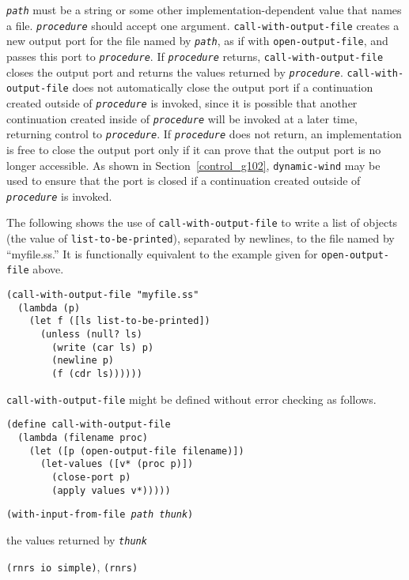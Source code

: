 \texttt{\textit{path}} must be a string or some other implementation-dependent 
value that names a file.
\texttt{\textit{procedure}} should accept one argument.
\texttt{call-with-output-file} creates a new output port for the file named
by \texttt{\textit{path}}, as if with \texttt{open-output-file}, and passes this port to \texttt{\textit{procedure}}.
If \texttt{\textit{procedure}} returns, \texttt{call-with-output-file} closes the output port
and returns the values returned by \texttt{\textit{procedure}}.
\texttt{call-with-output-file} does not automatically close the output
port if a continuation created outside of \texttt{\textit{procedure}} is invoked, since it
is possible that another continuation created inside of \texttt{\textit{procedure}} will be
invoked at a later time, returning control to \texttt{\textit{procedure}}.
If \texttt{\textit{procedure}} does not return, an implementation is free to close the
output port only if it can prove that the output port is no longer accessible.
As shown in Section \ref{control_g102}, \texttt{dynamic-wind} may be used to
ensure that the port is closed if a continuation created outside of
\texttt{\textit{procedure}} is invoked.

The following shows the use of \texttt{call-with-output-file} to
write a list of objects (the value of  \texttt{list-to-be-printed}),
separated by newlines, to the file named by ``myfile.ss.''
It is functionally equivalent to the example given for
\texttt{open-output-file} above.


\begin{alltt}
(call-with-output-file "myfile.ss"
  (lambda (p)
    (let f ([ls list-to-be-printed])
      (unless (null? ls)
        (write (car ls) p)
        (newline p)
        (f (cdr ls))))))
\end{alltt}

\texttt{call-with-output-file} might be defined without error checking as follows.

\begin{alltt}
(define call-with-output-file
  (lambda (filename proc)
    (let ([p (open-output-file filename)])
      (let-values ([v* (proc p)])
        (close-port p)
        (apply values v*)))))
\end{alltt}

\begin{description}

\label{io_s79}\item[procedure] \texttt{(with-input-from-file \textit{path} \textit{thunk})}



\item[returns] the values returned by \texttt{\textit{thunk}}


\item[libraries] \texttt{(rnrs io simple)}, \texttt{(rnrs)}
\end{description}

